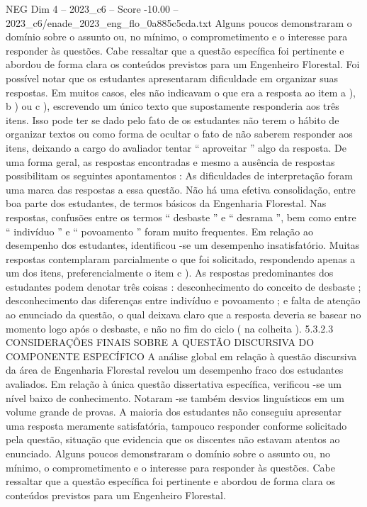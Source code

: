 \begin{textsample}{NEG Dim 4 – 2023\_c6 – Score -10.00 – 2023\_c6/enade\_2023\_eng\_flo\_0a885c5cda.txt}
Alguns poucos demonstraram o domínio sobre o assunto ou, no mínimo, o comprometimento e o interesse para responder às questões.
Cabe ressaltar que a questão específica foi pertinente e abordou de forma clara os conteúdos previstos para um Engenheiro Florestal.
Foi possível notar que os estudantes apresentaram dificuldade em organizar suas respostas.
Em muitos casos, eles não indicavam o que era a resposta ao item a ), b ) ou c ), escrevendo um único texto que supostamente responderia aos três itens.
Isso pode ter se dado pelo fato de os estudantes não terem o hábito de organizar textos ou como forma de ocultar o fato de não saberem responder aos itens, deixando a cargo do avaliador tentar “ aproveitar ” algo da resposta.
De uma forma geral, as respostas encontradas e mesmo a ausência de respostas possibilitam os seguintes apontamentos : As dificuldades de interpretação foram uma marca das respostas a essa questão.
Não há uma efetiva consolidação, entre boa parte dos estudantes, de termos básicos da Engenharia Florestal.
Nas respostas, confusões entre os termos “ desbaste ” e “ desrama ”, bem como entre “ indivíduo ” e “ povoamento ” foram muito frequentes.
Em relação ao desempenho dos estudantes, identificou -se um desempenho insatisfatório.
Muitas respostas contemplaram parcialmente o que foi solicitado, respondendo apenas a um dos itens, preferencialmente o item c ).
As respostas predominantes dos estudantes podem denotar três coisas : desconhecimento do conceito de desbaste ; desconhecimento das diferenças entre indivíduo e povoamento ; e falta de atenção ao enunciado da questão, o qual deixava claro que a resposta deveria se basear no momento logo após o desbaste, e não no fim do ciclo ( na colheita ). 5.3.2.3 CONSIDERAÇÕES FINAIS SOBRE A QUESTÃO DISCURSIVA DO COMPONENTE ESPECÍFICO A análise global em relação à questão discursiva da área de Engenharia Florestal revelou um desempenho fraco dos estudantes avaliados.
Em relação à única questão dissertativa específica, verificou -se um nível baixo de conhecimento.
Notaram -se também desvios linguísticos em um volume grande de provas.
A maioria dos estudantes não conseguiu apresentar uma resposta meramente satisfatória, tampouco responder conforme solicitado pela questão, situação que evidencia que os discentes não estavam atentos ao enunciado.
Alguns poucos demonstraram o domínio sobre o assunto ou, no mínimo, o comprometimento e o interesse para responder às questões.
Cabe ressaltar que a questão específica foi pertinente e abordou de forma clara os conteúdos previstos para um Engenheiro Florestal.

\end{textsample}
